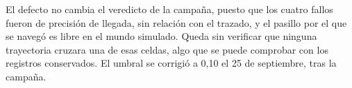 El defecto no cambia el veredicto de la campaña, puesto que los cuatro fallos fueron de precisión de llegada, sin relación con el trazado, y el pasillo por el que se navegó es libre en el mundo simulado. Queda sin verificar que ninguna trayectoria cruzara una de esas celdas, algo que se puede comprobar con los registros conservados. El umbral se corrigió a 0,10 el 25 de septiembre, tras la campaña.
